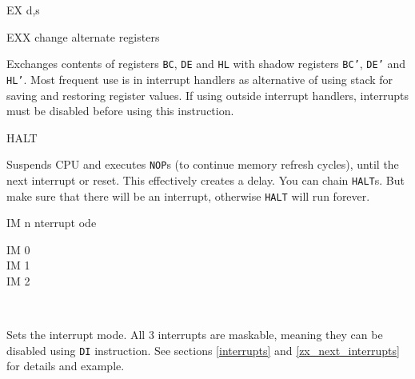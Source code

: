 \documentclass[12pt,twoside,openright,a4paper]{book}
\begin{document}
\begin{basedescript}{
	\desclabelstyle{\multilinelabel}
	\desclabelwidth{3cm}}
\begin{DetailItem}{EX d,s}
	\end{DetailItem}

	\begin{DetailItem}{EXX}
		{change alternate registers}
		{\SymEXX}

		Exchanges contents of registers {\tt BC}, {\tt DE} and {\tt HL} with shadow registers {\tt BC'}, {\tt DE'} and {\tt HL'}. Most frequent use is in interrupt handlers as alternative of using stack for saving and restoring register values. If using outside interrupt handlers, interrupts must be disabled before using this instruction.

		\DetailNoEffect
				
		\begin{DetailTiming}
		\end{DetailTiming}

	\end{DetailItem}

	\pagebreak
	\begin{DetailItem}{HALT}
		{\IH{HALT}}
		{}

		Suspends CPU and executes {\tt NOP}s (to continue memory refresh cycles), until the next interrupt or reset. This effectively creates a delay. You can chain {\tt HALT}s. But make sure that there will be an interrupt, otherwise {\tt HALT} will run forever.

		\DetailNoEffect
						
		\begin{DetailTiming}
			\DetailTime{}{1}{4}
		\end{DetailTiming}

	\end{DetailItem}

	\begin{DetailItem}{IM n}
		{nterrupt \IH{M}ode}
		{}

		\begin{DetailVariants}[1]
			IM 0\\
			IM 1\\
			IM 2
			
			\columnbreak
			~
		\end{DetailVariants}

		Sets the interrupt mode. All 3 interrupts are maskable, meaning they can be disabled using {\tt DI} instruction. See sections \ref{interrupts} and \ref{zx_next_interrupts} for details and example.

		\DetailNoEffect		

		\begin{DetailTiming}
			\DetailTime{}{2}{8}
		\end{DetailTiming}


\end{DetailItem}
\end{basedescript}
\end{document}
